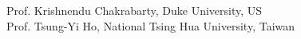 \vskip 2pt
Prof. Krishnendu Chakrabarty, Duke University, US\\
Prof. Tsung-Yi Ho, National Tsing Hua University, Taiwan
\vskip 8pt




